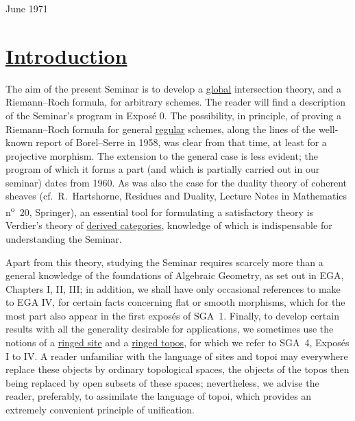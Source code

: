 \begin{flushright}June 1971\end{flushright}

%
%
\section*{\underline{Introduction}}
The aim of the present Seminar is to develop a \underline{global} intersection theory, and a Riemann--Roch formula, for arbitrary schemes. The reader will find a description of the Seminar's program in Exposé 0. The possibility, in principle, of proving a Riemann--Roch formula for general \underline{regular} schemes, along the lines of the well-known report of Borel--Serre in 1958, was clear from that time, at least for a projective morphism. The extension to the general case is less evident; the program of which it forms a part (and which is partially carried out in our seminar) dates from 1960. As was also the case for the duality theory of coherent sheaves (cf.\ R.~Hartshorne, Residues and Duality, Lecture Notes in Mathematics n\textsuperscript{o}~20, Springer), an essential tool for formulating a satisfactory theory is Verdier's theory of \underline{derived categories}, knowledge of which is indispensable for understanding the Seminar.

Apart from this theory, studying the Seminar requires scarcely more than a general knowledge of the foundations of Algebraic Geometry, as set out in EGA, Chapters I, II, III; in addition, we shall have only occasional references to make to EGA IV, for certain facts concerning flat or smooth morphisms, which for the most part also appear in the first exposés of SGA~1. Finally, to develop certain results with all the generality desirable for applications, we sometimes use the notions of a \underline{ringed site} and a \underline{ringed topos}, for which we refer to SGA~4, Exposés I to IV. A reader unfamiliar with the language of sites and topoi may everywhere replace these objects by ordinary topological spaces, the objects of the topos then being replaced by open subsets of these spaces; nevertheless, we advise the reader, preferably, to assimilate the language of topoi, which provides an extremely convenient principle of unification.

